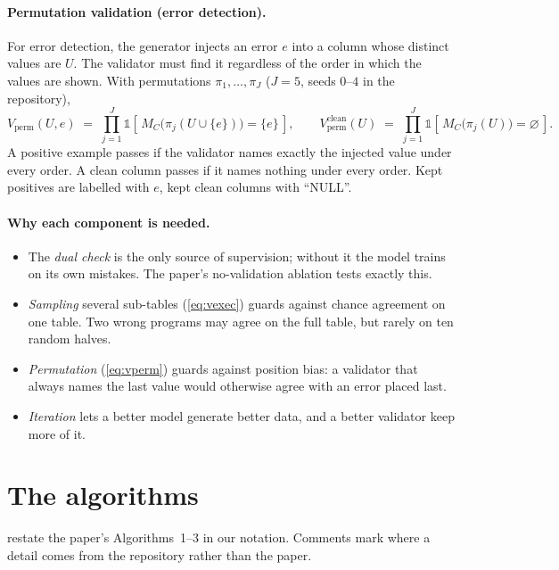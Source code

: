 \paragraph{Permutation validation (error detection).} For error detection, the generator injects an error $e$ into a
column whose distinct values are $U$. The validator must find it regardless of the order in which the values are shown.
With permutations $\pi_1,\dots,\pi_J$ ($J=5$, seeds $0$--$4$ in the repository),
\begin{equation}
  V_{\text{perm}}(U,e) \;=\; \prod_{j=1}^{J} \mathbb{1}\!\left[\, M_C\bigl(\pi_j(U \cup \{e\})\bigr) = \{e\} \,\right],
  \qquad
  V_{\text{perm}}^{\text{clean}}(U) \;=\; \prod_{j=1}^{J} \mathbb{1}\!\left[\, M_C\bigl(\pi_j(U)\bigr) = \varnothing
  \,\right].
  \label{eq:vperm}
\end{equation}
A positive example passes if the validator names exactly the injected value under every order. A clean column passes
if it names nothing under every order. Kept positives are labelled with $e$, kept clean columns with ``NULL''.

\paragraph{Why each component is needed.}
\begin{itemize}
\item The \emph{dual check} is the only source of supervision; without it the model trains on its own mistakes.
The paper's no-validation ablation tests exactly this.
\item \emph{Sampling} several sub-tables (\cref{eq:vexec}) guards against chance agreement on one table. Two wrong
programs may agree on the full table, but rarely on ten random halves.
\item \emph{Permutation} (\cref{eq:vperm}) guards against position bias: a validator that always names the last value
would otherwise agree with an error placed last.
\item \emph{Iteration} lets a better model generate better data, and a better validator keep more of it.
\end{itemize}

\section{The algorithms}\label{sec:paper-algorithms}

 restate the paper's Algorithms~1--3 in our notation. Comments mark
where a detail comes from the repository rather than the paper.

